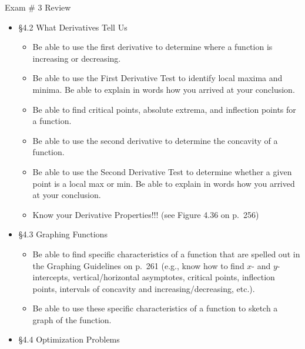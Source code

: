 \documentclass[cal1spr16Lectures.tex]{subfiles}
\begin{document}
\begin{frame}[allowframebreaks]{Exam \# 3 Review}
\begin{itemize}
\begin{itemize}
	\end{itemize}
\item \S 4.2 What Derivatives Tell Us
	\begin{itemize}\footnotesize
	\item Be able to use the first derivative to determine where a function is increasing or decreasing.
	\item Be able to use the \alert{First Derivative Test to identify local maxima and minima}.  Be able to explain in words how you arrived at your conclusion.
	\item Be able to find critical points, absolute extrema, and inflection points for a function.
	\item Be able to use the second derivative to determine the concavity of a function.
	\item Be able to use the \alert{Second Derivative Test to determine whether a given point is a local max or min}.  Be able to explain in words how you arrived at your conclusion.
	\item Know your Derivative Properties!!! (see Figure 4.36 on p.\ 256)
	\end{itemize}
\item \S 4.3 Graphing Functions
	\begin{itemize}\footnotesize
	\item Be able to find specific characteristics of a function that are spelled out in the Graphing Guidelines on p.\ 261 (e.g., know how to find $x$- and $y$-intercepts, vertical/horizontal asymptotes, critical points, inflection points, intervals of concavity and increasing/decreasing, etc.).  
	\item Be able to use these specific characteristics of a function to sketch a graph of the function.
	\end{itemize} 
\item \S 4.4 Optimization Problems

\end{itemize}
\end{frame}
\end{document}
